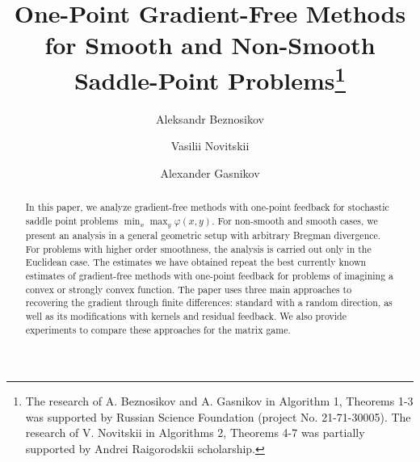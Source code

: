 \documentclass[runningheads]{llncs}
\begin{document}
 
%
\title{One-Point Gradient-Free Methods for Smooth and Non-Smooth Saddle-Point Problems\thanks{
The research of A. Beznosikov and A. Gasnikov in Algorithm 1, Theorems 1-3 was supported by Russian Science Foundation (project No. 21-71-30005). The research of V. Novitskii in Algorithms 2, Theorems 4-7 was partially supported by Andrei Raigorodskii scholarship.
}}
%
%
\author{Aleksandr Beznosikov\and
 Vasilii Novitskii \and
Alexander Gasnikov}
%
%
%
\maketitle              %
%
\begin{abstract}

In this paper, we analyze gradient-free methods with one-point feedback for stochastic saddle point problems $\min_{x}\max_{y}  \varphi(x, y)$. For non-smooth and smooth cases, we present an analysis in a general geometric setup with arbitrary Bregman divergence. For problems with higher order smoothness, the analysis is carried out only in the Euclidean case. The estimates we have obtained repeat the best currently known estimates of gradient-free methods with one-point feedback for problems of imagining a convex or strongly convex function. The paper uses three main approaches to recovering the gradient through finite differences: standard with a random direction, as well as its modifications with kernels and residual feedback. We also provide experiments to compare these approaches for the matrix game.

\end{abstract}
%
%
%
\end{document}
